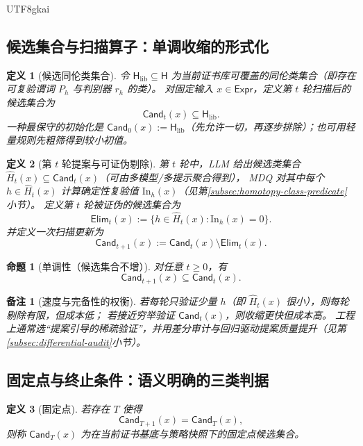 \documentclass[12pt]{article}
\newtheorem{definition}{定义}[section]
\newtheorem{proposition}{命题}[section]
\newtheorem{remark}{备注}[section]
\begin{document}
\begin{CJK*}{UTF8}{gkai}
\subsection{候选集合与扫描算子：单调收缩的形式化}
\label{subsec:candidate-set-scan-operator}

\begin{definition}[候选同伦类集合]
令 $\mathsf{H}_{\mathrm{lib}}\subseteq \mathsf{H}$ 为当前证书库可覆盖的同伦类集合（即存在可复验谓词 $P_h$ 与判别器 $r_h$ 的类）。
对固定输入 $x\in\mathsf{Expr}$，定义第 $t$ 轮扫描后的候选集合为
\[
\mathsf{Cand}_t(x)\subseteq \mathsf{H}_{\mathrm{lib}}.
\]
一种最保守的初始化是 $\mathsf{Cand}_0(x):=\mathsf{H}_{\mathrm{lib}}$（先允许一切，再逐步排除）；也可用轻量规则先粗筛得到较小初值。
\end{definition}

\begin{definition}[第 $t$ 轮提案与可证伪剔除]
第 $t$ 轮中，LLM 给出候选类集合 $\widehat{H}_t(x)\subseteq \mathsf{Cand}_t(x)$（可由多模型/多提示聚合得到），
MDQ 对其中每个 $h\in \widehat{H}_t(x)$ 计算确定性复验值 $\mathrm{In}_h(x)$（见第\ref{subsec:homotopy-class-predicate}小节）。
定义第 $t$ 轮被证伪的候选集合为
\[
\mathsf{Elim}_t(x):=\{h\in \widehat{H}_t(x):\mathrm{In}_h(x)=0\}.
\]
并定义一次扫描更新为
\[
\mathsf{Cand}_{t+1}(x):=\mathsf{Cand}_t(x)\setminus \mathsf{Elim}_t(x).
\]
\end{definition}

\begin{proposition}[单调性（候选集合不增）]
对任意 $t\ge 0$，有
\[
\mathsf{Cand}_{t+1}(x)\subseteq \mathsf{Cand}_t(x).
\]
\end{proposition}

\begin{remark}[速度与完备性的权衡]
若每轮只验证少量 $h$（即 $\widehat{H}_t(x)$ 很小），则每轮剔除有限，但成本低；
若接近穷举验证 $\mathsf{Cand}_t(x)$，则收缩更快但成本高。
工程上通常选“提案引导的稀疏验证”，并用差分审计与回归驱动提案质量提升（见第\ref{subsec:differential-audit}小节）。
\end{remark}

\subsection{固定点与终止条件：语义明确的三类判据}
\label{subsec:fixed-point-termination}

\begin{definition}[固定点]
若存在 $T$ 使得
\[
\mathsf{Cand}_{T+1}(x)=\mathsf{Cand}_T(x),
\]
则称 $\mathsf{Cand}_T(x)$ 为在当前证书基底与策略快照下的固定点候选集合。
\end{definition}


\end{CJK*}
\end{document}
